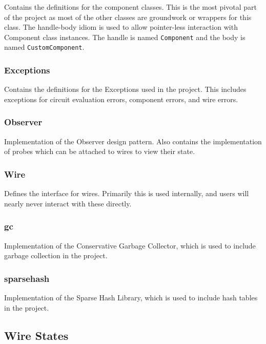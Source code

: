 \documentclass{article}
\newcommand{\ClassName}[1]{\texttt{#1}}
\begin{document}
Contains the definitions for the component classes. This is the most pivotal part of the project as most of the other classes are groundwork or wrappers for this class. The handle-body idiom is used to allow pointer-less interaction with Component class instances. The handle is named \ClassName{Component} and the body is named \ClassName{CustomComponent}.

\subsubsection{Exceptions}

Contains the definitions for the Exceptions used in the project. This includes exceptions for circuit evaluation errors, component errors, and wire errors.

\subsubsection{Observer}

Implementation of the Observer design pattern. Also contains the implementation of probes which can be attached to wires to view their state.

\subsubsection{Wire}

Defines the interface for wires. Primarily this is used internally, and users will nearly never interact with these directly.

\subsubsection{gc}

Implementation of the Conservative Garbage Collector, which is used to include garbage collection in the project.\cite{gc}

\subsubsection{sparsehash}

Implementation of the Sparse Hash Library, which is used to include hash tables in the project.\cite{sparsehash}

\subsection{Wire States}
\end{document}
